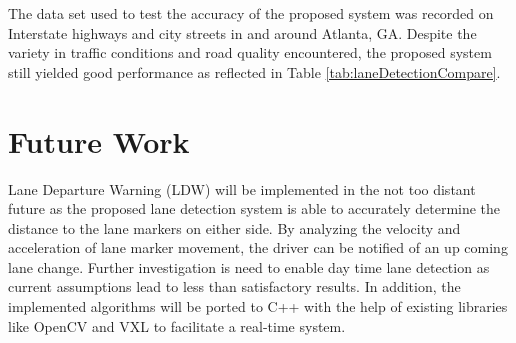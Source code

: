 \documentclass{article}
\begin{document}
The data set used to test the accuracy of the proposed system was recorded on Interstate highways and city streets in and around Atlanta, GA. Despite the variety in traffic conditions and road quality encountered, the proposed system still yielded good performance as reflected in Table \ref{tab:laneDetectionCompare}.

\section{Future Work}
\label{sec:print}
Lane Departure Warning (LDW) will be implemented in the not too distant future as the proposed lane detection system is able to accurately determine the distance to the lane markers on either side. By analyzing the velocity and acceleration of lane marker movement, the driver can be notified of an up coming lane change. Further investigation is need to enable day time lane detection as current assumptions lead to less than satisfactory results. In addition, the implemented algorithms will be ported to C++ with the help of existing libraries like OpenCV and VXL to facilitate a real-time system.



\end{document}
